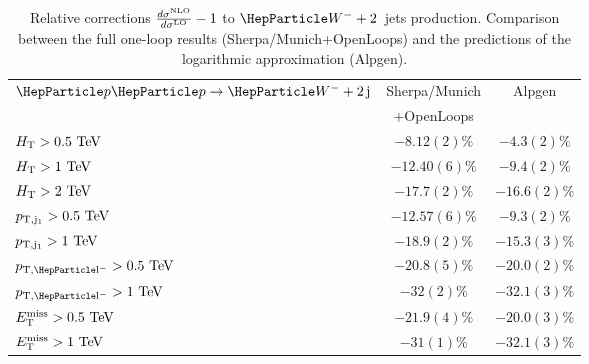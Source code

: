 \documentclass[11pt]{cernrep}
\begin{document}
\begin{table}
\centering
\small{
\begin{tabular}{l|c|c}
\hline
$\Pp\Pp\to\PW^-+2\,\rm j$ & {\sc Sherpa/Munich}  & {\sc Alpgen} \\[-1ex]
                          & {\sc +OpenLoops}  &  \\
\hline
\hline
$H_{\rm T}>0.5~\text{TeV}$ & $-8.12(2)\%$  & $-4.3(2)\%$       \\
$H_{\rm T}>1~\text{TeV}$   & $-12.40(6)\%$ & $-9.4(2)\% $      \\
$H_{\rm T}>2~\text{TeV}$   & $-17.7(2)\%$ & $-16.6(2)\%$     \\
\hline
$p_{\rm T,j_1}>0.5~\text{TeV}$  & $-12.57(6)\%$ & $-9.3(2)\%$     \\
$p_{\rm T,j_1}>1~\text{TeV}$    & $-18.9(2)\%$  & $-15.3(3)\%$      \\
\hline
$p_{\rm T,\Pl^-}>0.5\UTeV$  & $-20.8(5)\%$   &  $-20.0(2)\%$       \\
$p_{\rm T,\Pl^-}>1\UTeV$    & $-32(2)\%$     &  $-32.1(3)\%$       \\
\hline
$E_{\rm T}^{\rm miss}>0.5~\text{TeV}$  & $-21.9(4)\%$  &  $-20.0(3)\%$      \\
$E_{\rm T}^{\rm miss}>1~\text{TeV}$    & $-31(1)\%$    &  $-32.1(3)\%$     \\
\hline
\end{tabular}
}
\caption{ \label{tabelwmj} Relative corrections $\frac{d \sigma^{\rm NLO}}{d \sigma^{\rm LO}}-1$ to  
$\PW^-+2$~jets production. Comparison between the full one-loop results ({\sc Sherpa/Munich+OpenLoops}) and the 
predictions of the logarithmic approximation ({\sc Alpgen}).}
\end{table}
\end{document}
